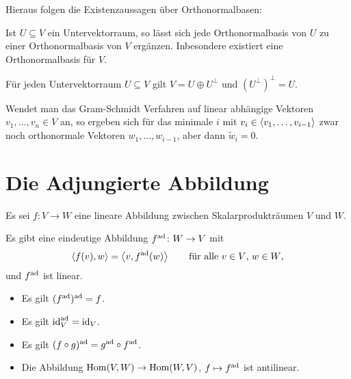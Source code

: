 Hieraus folgen die Existenzaussagen über Orthonormalbasen:

\begin{theorem}
  Ist $U \subseteq V$ ein Untervektorraum, so lässt sich jede Orthonormalbasis von $U$ zu einer Orthonormalbasis von $V$ ergänzen.
  Inbesondere existiert eine Orthonormalbasis für $V$.
\end{theorem}

\begin{corollary}
  Für jeden Untervektorraum $U \subseteq V$ gilt $V = U \oplus U^\perp$ und $(U^\perp)^\perp = U$.
\end{corollary}

\begin{remark}
  Wendet man das Gram-Schmidt Verfahren auf linear abhängige Vektoren $v_1, \dotsc, v_n \in V$ an, so ergeben sich für das minimale $i$ mit $v_i \in \left\langle v_1, \dotsc, v_{i-1} \right\rangle$ zwar noch orthonormale Vektoren $w_1, \dotsc, w_{i-1}$, aber dann $\tilde{w}_i = 0$.
\end{remark}






\section{Die Adjungierte Abbildung}
\label{section: adjoint map for scalar products}

Es sei $f \colon V \to W$ eine lineare Abbildung zwischen Skalarprodukträumen $V$ und $W$.

\begin{proposition}
  Es gibt eine eindeutige Abbildung $f^{\operatorname{ad}} \colon W \to V$ mit
  \begin{equation}
    \label{equation: definition of the adjoint map by elements for scalar products}
      \left\langle f(v), w \right\rangle
    = \left\langle v, f^{\operatorname{ad}}(w) \right\rangle
    \qquad
    \text{für alle $v \in V$, $w \in W$},
  \end{equation}
  und $f^{\operatorname{ad}}$ ist linear.
\end{proposition}

\begin{lemma}
  \begin{itemize}
    \item
      Es gilt $(f^{\operatorname{ad}})^{\operatorname{ad}} = f$.
    \item
      Es gilt $\operatorname{id}_V^{\operatorname{ad}} = \operatorname{id}_V$.
    \item
      Es gilt $(f \circ g)^{\operatorname{ad}} = g^{\operatorname{ad}} \circ f^{\operatorname{ad}}$.
    \item
      Die Abbildung $\operatorname{Hom}(V, W) \to \operatorname{Hom}(W, V)$, $f \mapsto f^{\operatorname{ad}}$ ist antilinear.
  \end{itemize}
\end{lemma}

